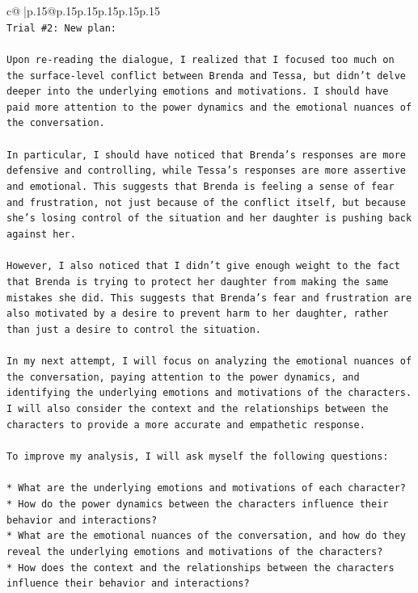 \documentclass{article}
\begin{document}
{\begin{supertabular}{c@{$\;$}|p{.15\linewidth}@{}p{.15\linewidth}p{.15\linewidth}p{.15\linewidth}p{.15\linewidth}p{.15\linewidth}}
{{{\\ 
\texttt{Trial \#2: New plan: } \\
\\ 
\texttt{Upon re{-}reading the dialogue, I realized that I focused too much on the surface{-}level conflict between Brenda and Tessa, but didn't delve deeper into the underlying emotions and motivations. I should have paid more attention to the power dynamics and the emotional nuances of the conversation. } \\
\\ 
\texttt{In particular, I should have noticed that Brenda's responses are more defensive and controlling, while Tessa's responses are more assertive and emotional. This suggests that Brenda is feeling a sense of fear and frustration, not just because of the conflict itself, but because she's losing control of the situation and her daughter is pushing back against her.} \\
\\ 
\texttt{However, I also noticed that I didn't give enough weight to the fact that Brenda is trying to protect her daughter from making the same mistakes she did. This suggests that Brenda's fear and frustration are also motivated by a desire to prevent harm to her daughter, rather than just a desire to control the situation.} \\
\\ 
\texttt{In my next attempt, I will focus on analyzing the emotional nuances of the conversation, paying attention to the power dynamics, and identifying the underlying emotions and motivations of the characters. I will also consider the context and the relationships between the characters to provide a more accurate and empathetic response.} \\
\\ 
\texttt{To improve my analysis, I will ask myself the following questions:} \\
\\ 
\texttt{* What are the underlying emotions and motivations of each character?} \\
\texttt{* How do the power dynamics between the characters influence their behavior and interactions?} \\
\texttt{* What are the emotional nuances of the conversation, and how do they reveal the underlying emotions and motivations of the characters?} \\
\texttt{* How does the context and the relationships between the characters influence their behavior and interactions?} \\
}}}
\end{supertabular}}
\end{document}
